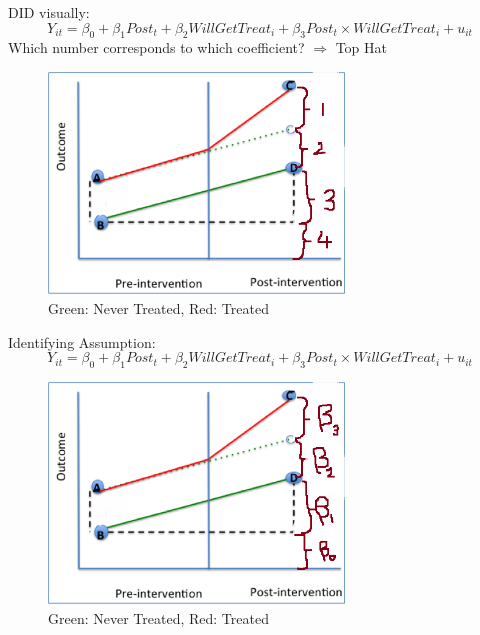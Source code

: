 \documentclass[
  ignorenonframetext,
]{beamer}
\begin{document}
\begin{frame}{DID visually:}
\protect\hypertarget{did-visually}{}
\[
Y_{it}=\beta_0+\beta_1 Post_t+\beta_2 WillGetTreat_i+\beta_3 Post_t\times WillGetTreat_i+u_{it}
\] Which number corresponds to which coefficient? \(\Rightarrow\) Top
Hat

\begin{figure}
\centering
\includegraphics[width=0.7\textwidth,height=\textheight]{"images/DIDregression.png"}
\caption{Green: Never Treated, Red: Treated}
\end{figure}
\end{frame}

\begin{frame}{Identifying Assumption:}
\protect\hypertarget{identifying-assumption-1}{}
\[
Y_{it}=\beta_0+\beta_1 Post_t+\beta_2 WillGetTreat_i+\beta_3 Post_t\times WillGetTreat_i+u_{it}
\]

\begin{figure}
\centering
\includegraphics[width=0.7\textwidth,height=\textheight]{"images/DIDregressionnum.png"}
\caption{Green: Never Treated, Red: Treated}
\end{figure}
\end{frame}
\end{document}
